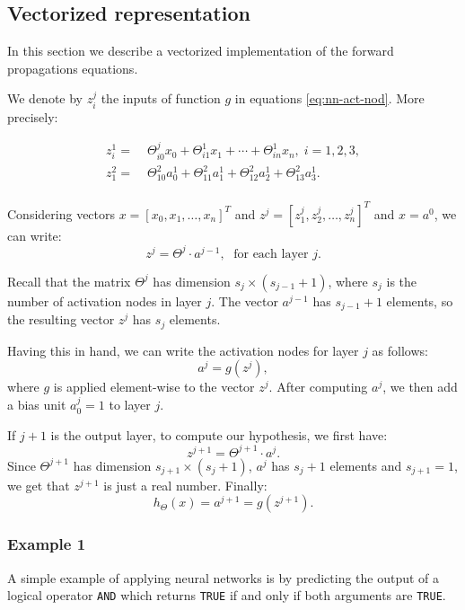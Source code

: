 \documentclass[a4paper,11pt]{report}
\begin{document}
\subsection*{Vectorized representation}

In this section we describe a vectorized implementation of the forward propagations equations.

We denote by $z^j_i$ the inputs of function $g$ in equations \eqref{eq:nn-act-nod}. More precisely:

\begin{equation}\label{eq:nn-def-z's}
\begin{split}
z_i^{1} = & \; \Theta_{i0}^{j}x_0 + \Theta_{i1}^{1}x_1 + \cdots + \Theta_{in}^{1}x_n,\; i=1,2,3, \\
z_1^{2} = & \; \Theta_{10}^{2}a_0^{1} + \Theta_{11}^{2}a_1^{1} + \Theta_{12}^{2}a_2^{1} + \Theta_{13}^{2}a_3^{1}. \\
\end{split}
\end{equation}

Considering vectors $x = [x_0, x_1, \ldots, x_n]^T$ and $z^j = [z^j_1, z^j_2, \ldots, z^j_n]^T$  and $x = a^0$, we can write: $$z^{j} = \Theta^{j} \cdot a^{j-1}, \; \text{ for each layer } j.$$

Recall that the matrix $\Theta^j$ has dimension $s_{j}\times (s_{j-1}+1)$, where $s_j$ is the number of activation nodes in layer $j$. The vector $a^{j-1}$ has $s_{j-1}+1$ elements, so the resulting vector $z^{j}$ has $s_j$ elements.

Having this in hand, we can write the activation nodes for layer $j$ as follows: $$a^{j} = g(z^{j}),$$ where $g$ is applied element-wise to the vector $z^{j}$. After computing $a^{j}$, we then add a bias unit $a_0^{j} = 1$ to layer $j$.

If $j+1$ is the output layer, to compute our hypothesis, we first have: $$z^{j+1}=\Theta^{j+1}\cdot a^j.$$
Since $\Theta^{j+1}$ has dimension $s_{j+1}\times (s_{j}+1)$, $a^j$ has $s_j + 1$ elements and $s_{j+1} = 1$, we get that $z^{j+1}$ is just a real number.
Finally: $$h_\Theta(x) = a^{j+1} = g(z^{j+1}).$$


\subsubsection*{Example 1}

A simple example of applying neural networks is by predicting the output of a logical operator \verb"AND" which returns \verb"TRUE" if and only if both arguments are \verb"TRUE".
\end{document}
